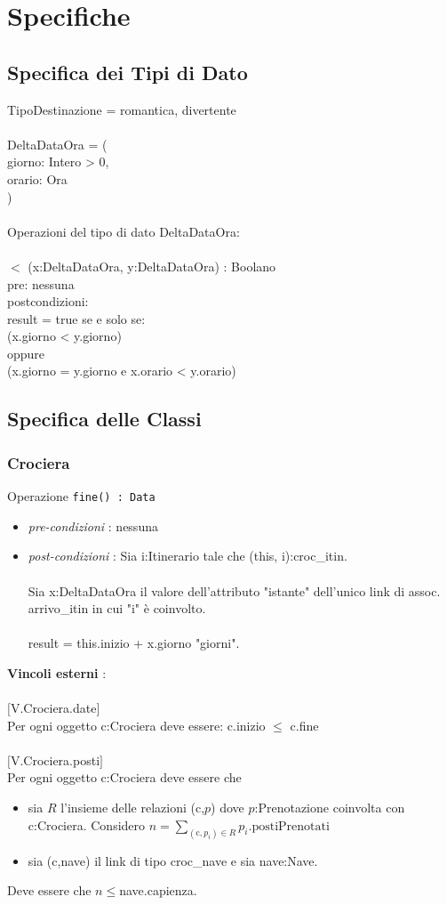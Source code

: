 \documentclass[12pt, letterpaper]{article}
\newcommand{\acc}{\\\hphantom{}\\}
\newcommand{\code}[1]{\colorbox{light-gray}{\texttt{#1}}}
\begin{document}
\section{Specifiche}
\subsection{Specifica dei Tipi di Dato}
TipoDestinazione = {romantica, divertente}\acc
DeltaDataOra = (\\
\hphantom{ident}giorno: Intero > 0,\\
\hphantom{ident}orario: Ora	\\
)\acc
Operazioni del tipo di dato DeltaDataOra:\acc
\hphantom{ident}$<$ (x:DeltaDataOra, y:DeltaDataOra) : Boolano\\
\hphantom{ident}\hphantom{ident}pre: nessuna\\
\hphantom{ident}\hphantom{ident}postcondizioni:\\
\hphantom{ident}\hphantom{ident}result = true se e solo se:\\
\hphantom{ident}\hphantom{ident}(x.giorno < y.giorno)\\
\hphantom{ident}\hphantom{ident}oppure\\
\hphantom{ident}\hphantom{ident}(x.giorno = y.giorno e x.orario < y.orario)
\subsection{Specifica delle Classi}
\subsubsection{Crociera}
Operazione \code{fine() : Data}\begin{itemize}
    \item \textit{pre-condizioni} : nessuna
    \item \textit{post-condizioni} : Sia i:Itinerario tale che (this, i):croc\_itin.\acc
          Sia x:DeltaDataOra il valore dell'attributo "istante" dell'unico link di assoc.
          arrivo\_itin in cui "i" è coinvolto.\acc
          result = this.inizio + x.giorno "giorni".
\end{itemize}
\textbf{Vincoli esterni} :\acc
$[$V.Crociera.date$]$\\
\hphantom{ident}Per ogni oggetto c:Crociera deve essere: c.inizio $\le$ c.fine\acc
$[$V.Crociera.posti$]$\\
\hphantom{ident}Per ogni oggetto c:Crociera deve essere che\begin{itemize}
    \item  sia $R$ l'insieme delle relazioni (c,$p$) dove
          $p$:Prenotazione coinvolta con c:Crociera. Considero $n=\displaystyle\sum_{(\text{c},p_i)\in R}p_i.\text{postiPrenotati}$
    \item sia (c,nave) il link di tipo croc\_nave e sia nave:Nave.
\end{itemize}
\hphantom{ident} Deve essere che $n\le$nave.capienza.
\end{document}
